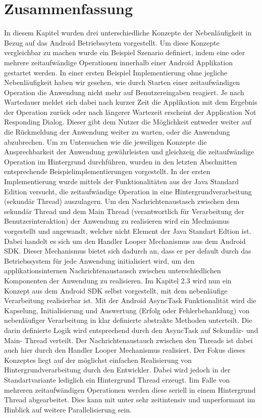 \documentclass[12pt,oneside,a4paper,bibtotoc,liststotoc]{scrreprt}
\begin{document}
\section{Zusammenfassung}
In diesem Kapitel wurden drei unterschiedliche Konzepte der Nebenläufigkeit in Bezug auf das Android Betriebssytem vorgestellt. Um diese Konzepte vergleichbar zu machen wurde ein Beispiel Szenario definiert, indem eine oder mehrere zeitaufwändige Operationen innerhalb einer Android Applikation gestartet werden. In einer ersten Beispiel Implementierung ohne jegliche Nebenläufigkeit haben wir gesehen, wie durch Starten einer zeitaufwändigen Operation die Anwendung nicht mehr auf Benutzereingaben reagiert. Je nach Wartedauer meldet sich dabei nach kurzer Zeit die Applikation mit dem Ergebnis der Operation zurück oder nach längerer Wartezeit erscheint der Application Not Responding Dialog. Dieser gibt dem Nutzer die Möglichkeit entweder weiter auf die Rückmeldung der Anwendung weiter zu warten, oder die Anwendung abzubrechen. Um zu Untersuchen wie die jeweiligen Konzepte die Ansprechbarkeit der Anwendung gewährleisten und gleichzeig die zeitaufwändige Operation im Hintergrund durchführen, wurden in den letzten Abschnitten entsprechende Beispielimplementierungen  vorgestellt.\newline
In der ersten Implementierung wurde mittels der Funktionalitäten aus der Java Standard Edition versucht, die zeitaufwändige Operation in eine Hintergrundverarbeitung (sekundär Thread) auszulagern. Um den Nachrichtenaustasch zwischen dem sekundär Thread und dem Main Thread (verantwortlich für Verarbeitung der Benutzerinteraktion) der Anwendung zu realisieren wird ein Mechnismus vorgestellt und angewandt, welcher nicht Element der Java Standart Edtion ist. Dabei handelt es sich um den Handler Looper Mechanismus aus dem Android SDK. Dieser Mechanismus bietet sich dadurch an, dass er per default durch das Betriebssystem für jede Anwendung initialisiert wird, um den applikationsinternen Nachrichtenaustausch zwischen unterschiedlichen Komponenten der Anwendung zu realisieren.\newline
Im Kapitel 2.3 wird nun ein Konzept aus dem Android SDK selbst vorgestellt, mit dem nebenläufige Verarbeitung realisierbar ist. Mit der Android AsyncTask Funktionalität wird die Kapselung, Initialisierung und Auswertung (Erfolg oder Fehlerbehanldung) von nebenläufiger Verarbeitung in klar definierte abstrakte Methoden unterteilt. Die darin definierte Logik wird entsprechend durch den AsyncTask auf Sekundär- und Main- Thread verteilt. Der Nachrichtenaustauch zwischen den Threads ist dabei auch hier durch den Handler Looper Mechanismus realisiert. Der Fokus dieses Konzeptes liegt auf der möglichst einfachen Realisierung von Hintergrundverarbeitung durch den Entwickler. Dabei wird jedoch in der Standartvariante lediglich ein Hintergrund Thread erzeugt. Iim Falle von mehreren zeitaufwändigen Operationen werden diese seriell in einem Hintergrund Thread abgearbeitet. Dies kann mit unter sehr zeitintensiv und unperformant im Hinblick auf weitere Parallelisierung sein. \newline
\end{document}
